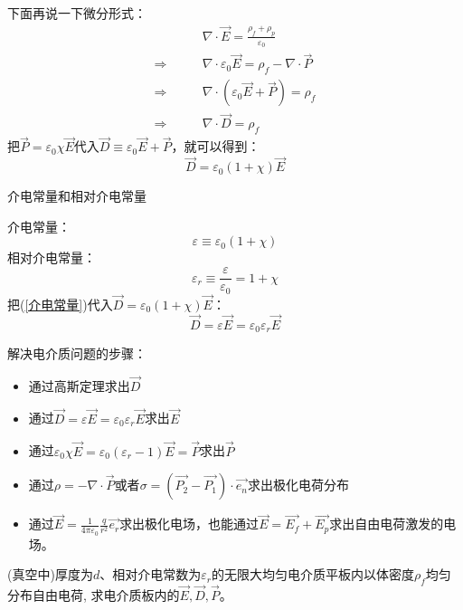 \documentclass[cn,hazy,blue,14pt,normal]{elegantnote}
\numberwithin{equation}{section}
\begin{document}
下面再说一下微分形式：
\begin{align*}
	&\nabla \cdot \vec{E} = \frac{\rho_f + \rho_p}{\varepsilon_0} \\
	\Rightarrow \qquad
	&\nabla \cdot \varepsilon_0 \vec{E} = \rho_f - \nabla \cdot \vec{P}\\
	\Rightarrow \qquad
	&\nabla \cdot \left(\varepsilon_0\vec{E}+\vec{P}\right) = \rho_f\\
	\Rightarrow \qquad
	&\nabla \cdot \vec{D} = \rho_f
\end{align*}
把$\vec{P} = \varepsilon_0\chi\vec{E}$代入$\vec{D} \equiv \varepsilon_0\vec{E}+\vec{P}$，就可以得到：
$$
\vec{D} = \varepsilon_0 \left(1 + \chi \right) \vec{E}
$$
\begin{definition}
	介电常量和相对介电常量
\end{definition}
介电常量：
\begin{equation}\label{介电常量}
	\varepsilon \equiv \varepsilon_0\left(1 + \chi \right) 
\end{equation}
相对介电常量：
\begin{equation}
	 \varepsilon_r \equiv \frac{\varepsilon}{\varepsilon_0} = 1 + \chi
\end{equation}
把(\ref{介电常量})代入$\vec{D} = \varepsilon_0 \left(1 + \chi \right) \vec{E}$：
\begin{equation}
	\vec{D} = \varepsilon \vec{E} = \varepsilon_0 \varepsilon_r \vec{E}
\end{equation}
\begin{note}
	解决电介质问题的步骤：
\end{note}
\begin{itemize}
	\item 通过高斯定理求出$\vec{D}$
	\item 通过$\vec{D} = \varepsilon \vec{E} = \varepsilon_0 \varepsilon_r \vec{E}$求出$\vec{E}$
	\item 通过$\varepsilon_0 \chi \vec{E} = \varepsilon_0(\varepsilon_r - 1) \vec{E} = \vec{P}$求出$\vec{P}$
	\item 通过$\rho = -\nabla \cdot \vec{P}$或者$\sigma = (\vec{P_2}-\vec{P_1})\cdot \vec{e_{n}}$求出极化电荷分布
	\item 通过$\vec{E} = \frac{1}{4\pi\varepsilon_0}\frac{q}{r^2}\vec{e_r}$求出极化电场，也能通过$\vec{E} = \vec{E_f} + \vec{E_p}$求出自由电荷激发的电场。
\end{itemize}
\begin{example}
	(真空中)厚度为$d$、相对介电常数为$\varepsilon_r$的无限大均匀电介质平板内以体密度$\rho_f$均匀分布自由电荷,
	求电介质板内的$\vec{E},\vec{D},\vec{P}$。
\end{example}
\end{document}
